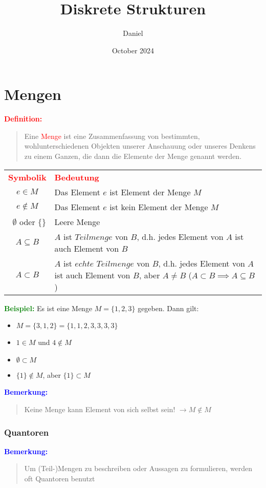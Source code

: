 \documentclass{article}
\title{Diskrete Strukturen}
\author{Daniel}
\date{October 2024}
\newcommand{\red}[1]{\textcolor{red}{#1}}
\newcommand{\blue}[1]{\textcolor{blue}{#1}}
\newcommand{\green}[1]{\textcolor{green}{#1}}
\newcommand{\ex}{\green{\textbf{Beispiel: }}}
\newcommand{\de}[1]{\red{\textbf{Definition: }}\begin{quote}#1\end{quote}}
\newcommand{\an}[1]{\blue{\textbf{Bemerkung: }}\begin{quote}#1\end{quote}}
\begin{document}
\maketitle
\tableofcontents

\newpage
\section{Mengen}

\de{Eine \red{Menge} ist eine Zusammenfassung von bestimmten, wohlunterschiedenen Objekten unserer Anschauung oder unseres Denkens zu einem Ganzen, die dann die Elemente der Menge genannt werden.}

\begin{table}[ht]
    \centering
    \begin{tabular}{c p{9cm}}
        \textbf{\red{Symbolik}} & \textbf{\red{Bedeutung}}\\
        $e \in M$ & Das Element $e$ ist Element der Menge $M$\\
        $e \notin M $ & Das Element $e$ ist kein Element der Menge $M$\\\
        $\emptyset$ oder $\{\}$ & Leere Menge\\
        $A \subseteq B$ & $A$ ist $Teilmenge$ von $B$, d.h. jedes Element von $A$ ist auch Element von $B$\\
        $A \subset B$ & $A$ ist $echte$ $Teilmenge$ von $B$, d.h. jedes Element von $A$ ist auch Element von $B$, aber $A \neq B$ ($A \subset B \implies A \subseteq B$)
    \end{tabular}
\end{table}

\ex Es ist eine Menge $M = \{1, 2, 3\}$ gegeben. Dann gilt:
\begin{itemize}
    \item $M = \{3, 1, 2\} = \{1, 1, 2, 3, 3, 3, 3\}$
    \item $1 \in M$ und $4 \notin M$
    \item $\emptyset \subset M$
    \item $\{1\} \notin M$, aber $\{1\} \subset M$
\end{itemize}

\an{Keine Menge kann Element von sich selbst sein! $ \rightarrow M \notin M$}

{}
\subsubsection{Quantoren}
\an{Um (Teil-)Mengen zu beschreiben oder Aussagen zu formulieren, werden oft Quantoren benutzt}
\end{document}
